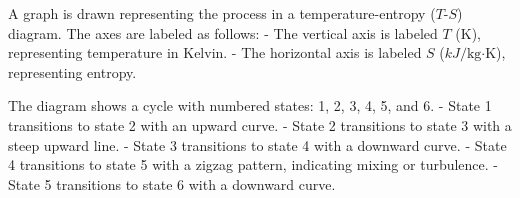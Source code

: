 A graph is drawn representing the process in a temperature-entropy (\(T\)-\(S\)) diagram. The axes are labeled as follows:  
- The vertical axis is labeled \(T\) (K), representing temperature in Kelvin.  
- The horizontal axis is labeled \(S\) (\(kJ/\text{kg·K}\)), representing entropy.  

The diagram shows a cycle with numbered states: 1, 2, 3, 4, 5, and 6.  
- State 1 transitions to state 2 with an upward curve.  
- State 2 transitions to state 3 with a steep upward line.  
- State 3 transitions to state 4 with a downward curve.  
- State 4 transitions to state 5 with a zigzag pattern, indicating mixing or turbulence.  
- State 5 transitions to state 6 with a downward curve.